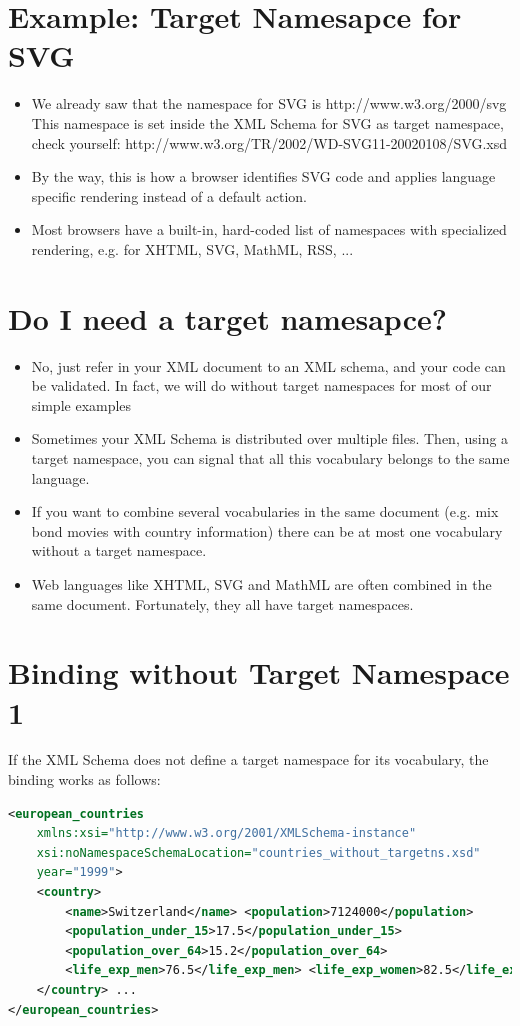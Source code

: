 \section{Example: Target Namesapce for SVG}
\begin{itemize}
\item We already saw that the namespace for SVG is
http://www.w3.org/2000/svg
This namespace is set inside the XML Schema for SVG as target namespace, check yourself:
http://www.w3.org/TR/2002/WD-SVG11-20020108/SVG.xsd
\item By the way, this is how a browser identifies SVG code and applies language specific rendering instead of a default action.
\item Most browsers have a built-in, hard-coded list of namespaces with specialized rendering, e.g. for XHTML, SVG, MathML, RSS, ...
\end{itemize}

\section{Do I need a target namesapce?}

\begin{itemize}
\item No, just refer in your XML document to an XML schema, and your code can be validated. In fact, we will do without target namespaces for most of our simple examples
\item Sometimes your XML Schema is distributed over multiple files. Then, using a target namespace, you can signal that all this vocabulary belongs to the same language.
\item If you want to combine several vocabularies in the same document (e.g. mix bond movies with country information) there can be at most one vocabulary without a target namespace.
\item Web languages like XHTML, SVG and MathML are often combined in the same document. Fortunately, they all have target namespaces.
\end{itemize}


\section{Binding without Target Namespace 1}
If the XML Schema does not define a target namespace for its vocabulary, the binding works as follows:
\begin{lstlisting}[language=XML, caption={Binding without Target Namespace 1}]
<european_countries 
	xmlns:xsi="http://www.w3.org/2001/XMLSchema-instance"
	xsi:noNamespaceSchemaLocation="countries_without_targetns.xsd"
	year="1999">
	<country>
		<name>Switzerland</name> <population>7124000</population>
		<population_under_15>17.5</population_under_15> 
		<population_over_64>15.2</population_over_64> 
		<life_exp_men>76.5</life_exp_men> <life_exp_women>82.5</life_exp_women>
	</country> ...
</european_countries>
\end{lstlisting}


